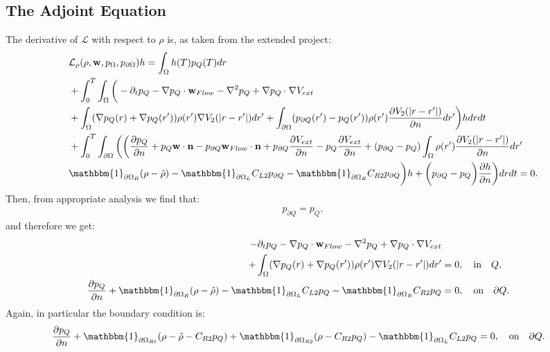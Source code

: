 \documentclass[11pt, a4paper]{article}
\newcommand{\Sta}{\rho}
\newcommand{\Adja}{{p}_Q}
\newcommand{\Adjc}{p_{\partial Q}}
\theoremstyle{definition}
\begin{document}
\subsection*{The Adjoint Equation}
The derivative of $\mathcal{L}$ with respect to $\rho$ is, as taken from the extended project:
\begin{align*}
&\mathcal{L}_\rho (\rho,\mathbf{w},p_\Omega,p_{\partial \Omega})h=
\int_\Omega h(T) \Adja(T) dr\\
&+ \int_0^T \int_\Omega \bigg(   - \partial_t \Adja  - \nabla \Adja \cdot \mathbf{w}_{Flow}  - \nabla^2 \Adja \notag 
+  \nabla \Adja \cdot \nabla V_{ext}  \notag \\
&+ \int_\Omega (\nabla  \Adja(r)+\nabla  \Adja(r')) \rho(r') \nabla V_2(|r-r'|) dr'+ \int_{\partial \Omega} ( \Adjc(r') - \Adja(r')) \rho(r')   \frac{\partial V_2(|r-r'|)}{\partial n} dr' \bigg) h dr dt \\
&+  \int_0^T\int_{\partial \Omega}  \bigg(
\bigg(\frac{\partial \Adja }{\partial n} + \Adja  \mathbf{w} \cdot \mathbf{n} - \Adjc \mathbf{w}_{Flow} \cdot \mathbf{n}  +  \Adjc \dfrac{\partial V_{ext}}{\partial n} - \Adja \frac{\partial V_{ext}}{\partial n} + ( \Adjc - \Adja)  \int_\Omega \rho(r') \frac{\partial V_2(|r-r'|)}{\partial n} dr'\\
&\mathbbm{1}_{\partial \Omega_R} (\rho- \hat{\rho}) -\mathbbm{1}_{\partial \Omega_L} C_{L2} \Adjc   -\mathbbm{1}_{\partial \Omega_R} C_{R2} \Adjc \bigg)h + \bigg( \Adjc- \Adja \bigg) \frac{\partial h}{\partial n} \bigg) dr dt =0.
\end{align*}
Then, from appropriate analysis we find that:
\begin{align*}
\Adjc = \Adja,
\end{align*}
and therefore we get:
\begin{align*}
- \partial_t  \Adja  - \nabla \Adja \cdot \mathbf{w}_{Flow}  - \nabla^2 \Adja \notag 
+  \nabla \Adja \cdot \nabla V_{ext}  \notag \\
+ \int_\Omega (\nabla  \Adja(r)+\nabla  \Adja(r')) \rho(r') \nabla V_2(|r-r'|) dr' &=0, \quad \text{in} \quad Q, \\
\frac{\partial \Adja }{\partial n}+ \mathbbm{1}_{\partial \Omega_R} (\rho- \hat{\rho}) -\mathbbm{1}_{\partial \Omega_L} C_{L2} \Adja   -\mathbbm{1}_{\partial \Omega_R} C_{R2} \Adja&=0, \quad \text{on} \quad \partial Q.
\end{align*}
Again, in particular the boundary condition is:
\begin{align*}
\frac{\partial \Adja }{\partial n}+ \mathbbm{1}_{\partial \Omega_{R1}}(\rho- \tilde{\rho} -C_{R2} \Adja) + \mathbbm{1}_{\partial \Omega_{R2}} (\Sta-C_{R2} \Adja) - \mathbbm{1}_{\partial \Omega_L} C_{L2} \Adja   &=0, \quad \text{on} \quad \partial Q.
\end{align*}
\end{document}
